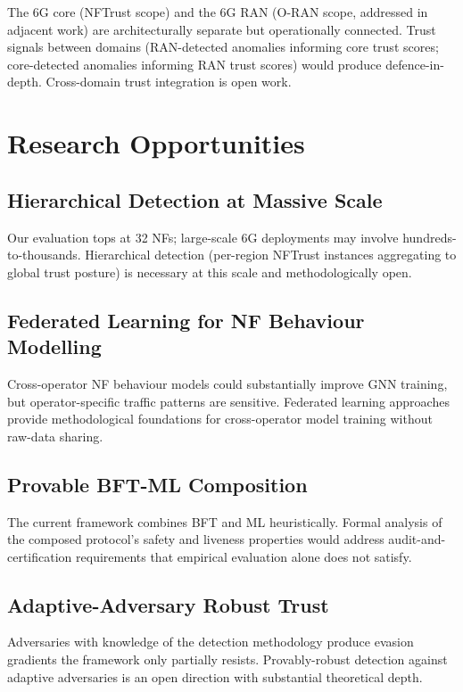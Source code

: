 \documentclass[sigconf,nonacm]{acmart}
\begin{document}
The 6G core (NFTrust scope) and the 6G RAN (O-RAN scope, addressed
in adjacent work) are architecturally separate but
operationally connected. Trust signals between domains
(RAN-detected anomalies informing core trust scores; core-detected
anomalies informing RAN trust scores) would produce
defence-in-depth. Cross-domain trust integration is open work.

\section{Research Opportunities}

\subsection{Hierarchical Detection at Massive Scale}

Our evaluation tops at 32 NFs; large-scale 6G deployments may
involve hundreds-to-thousands. Hierarchical detection
(per-region NFTrust instances aggregating to global trust
posture) is necessary at this scale and methodologically open.

\subsection{Federated Learning for NF Behaviour Modelling}

Cross-operator NF behaviour models could substantially improve
GNN training, but operator-specific traffic patterns are
sensitive. Federated learning approaches~\cite{kairouz2024fedml}
provide methodological foundations for cross-operator model
training without raw-data sharing.

\subsection{Provable BFT-ML Composition}

The current framework combines BFT and ML heuristically. Formal
analysis of the composed protocol's safety and liveness
properties would address audit-and-certification requirements
that empirical evaluation alone does not satisfy.

\subsection{Adaptive-Adversary Robust Trust}

Adversaries with knowledge of the detection methodology produce
evasion gradients the framework only partially resists.
Provably-robust detection against adaptive adversaries is an open
direction with substantial theoretical depth.
\end{document}
